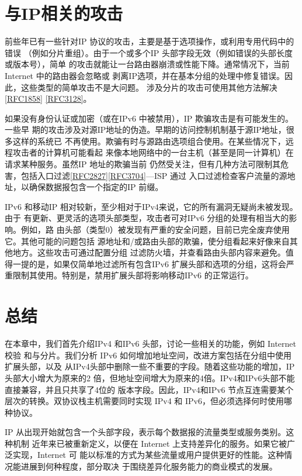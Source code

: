 \section{与IP相关的攻击}

前些年已有一些针对IP 协议的攻击，主要是基于选项操作，或利用专用代码中的错误
（例如分片重组）。由于一个或多个IP 头部字段无效（例如错误的头部长度或版本号），简单
的攻击就能让一台路由器崩溃或性能下降。通常情况下，当前 Internet 中的路由器会忽略或
剥离IP选项，并在基本分组的处理中修复错误。因此，这些类型的简单攻击不是大问题。
涉及分片的攻击可使用其他方法解决\href{https://www.rfc-editor.org/rfc/rfc1858}{[RFC1858]}
\href{https://www.rfc-editor.org/rfc/rfc3128}{[RFC3128]}。

如果没有身份认证或加密（或在IPv6 中被禁用），IP 欺骗攻击是有可能发生的。一些早
期的攻击涉及对源IP地址的伪造。早期的访问控制机制基于源IP地址，很多这样的系统已
不再使用。欺骗有时与源路由选项组合使用。在某些情况下，远程攻击者的计算机可能看起
来像本地网络中的一台主机（甚至是同一计算机）在请求某种服务。虽然IP 地址的欺骗当前
仍然受关注，但有几种方法可限制其危害，包括入口过滤\href{https://www.rfc-editor.org/rfc/rfc2827}{[RFC2827]}\href{https://www.rfc-editor.org/rfc/rfc3704}{[RFC3704]}—ISP
通过
入口过滤检查客户流量的源地址，以确保数据报包含一个指定的IP 前缀。

IPv6 和移动IP 相对较新，至少相对于IPv4来说，它的所有漏洞无疑尚未被发现。由于
有更新、更灵活的选项头部类型，攻击者可对IPv6 分组的处理有相当大的影响。例如，路
由头部（类型0）被发现有严重的安全问题，目前已完全废弃使用它。其他可能的问题包括
源地址和/或路由头部的欺骗，使分组看起来好像来自其他地方。这些攻击可通过配置分组
过滤防火墙，并查看路由头部内容来避免。值得一提的是，如果仅简单地过滤所有包含IPv6
扩展头部和选项的分组，这将会严重限制其使用。特别是，禁用扩展头部将影响移动IPv6
的正常运行。

\section{总结}
在本章中，我们首先介绍IPv4 和IPv6 头部，讨论一些相关的功能，例如 Internet 校验
和与分片。我们分析 IPv6 如何增加地址空间，改进方案包括在分组中使用扩展头部，以及
从IPv4头部中删除一些不重要的字段。随着这些功能的增加，IP 头部大小增大为原来的2
倍，但地址空间增大为原来的4倍。IPv4和IPv6头部不能直接兼容，并且只共享了4位的
版本字段。因此，IPv4和IPv6 节点互连需要某个层次的转换。双协议栈主机需要同时实现
IPv4 和 IPv6，但必须选择何时使用哪种协议。

IP 从出现开始就包含一个头部字段，表示每个数据报的流量类型或服务类别。这种机制
近年来已被重新定义，以便在 Internet 上支持差异化的服务。如果它被广泛实现，Internet 可
能以标准的方式为某些流量或用户提供更好的性能。这种情况能进展到何种程度，部分取决
于围绕差异化服务能力的商业模式的发展。

